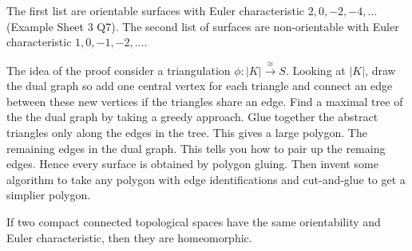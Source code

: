 \documentclass{article}
\newcommand{\homeo}{\overset{\cong}{\longrightarrow}}
\begin{document}
The first list are orientable surfaces with Euler characteristic $ 2,0,-2,-4,\dots $ (Example Sheet 3 Q7). The second list of surfaces are non-orientable with Euler characteristic $ 1,0,-1,-2,\dots $.
\par
The idea of the proof consider a triangulation $ \phi:|K|\homeo S $. Looking at $ |K| $, draw the dual graph so add one central vertex for each triangle and connect an edge between these new vertices if the triangles share an edge. Find a maximal tree of the the dual graph by taking a greedy approach. Glue together the abstract triangles only along the edges in the tree. This gives a large polygon. The remaining edges in the dual graph. This tells you how to pair up the remaing edges. Hence every surface is obtained by polygon gluing. Then invent some algorithm to take any polygon with edge identifications and cut-and-glue to get a simplier polygon.
\begin{corollary}
  If two compact connected topological spaces have the same orientability and Euler characteristic, then they are homeomorphic.
\end{corollary}
\end{document}

